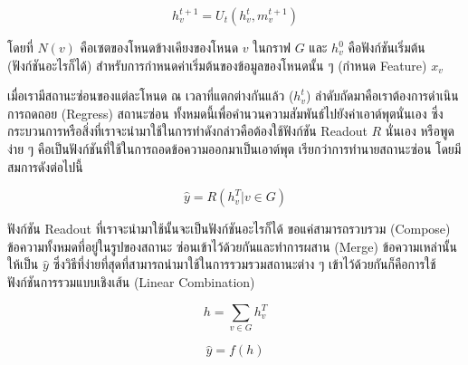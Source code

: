 \begin{equation}\label{hidden_func}
    h^{t+1}_{v} = U_{t}(h^{t}_{v}, m^{t+1}_{v})
\end{equation}

\noindent โดยที่ $N(v)$ คือเซตของโหนดข้างเคียงของโหนด $v$ ในกราฟ $G$ และ $h^{0}_{v}$ คือฟังก์ชันเริ่มต้น (ฟังก์ชันอะไรก็ได้) 
สำหรับการกำหนดค่าเริ่มต้นของข้อมูลของโหนดนั้น ๆ (กำหนด Feature) $x_{v}$

\begin{center}
\end{center}

เมื่อเรามีสถานะซ่อนของแต่ละโหนด ณ เวลาที่แตกต่างกันแล้ว ($h^{t}_{v}$) ลำดับถัดมาคือเราต้องการดำเนินการถดถอย (Regress) สถานะซ่อน%
ทั้งหมดนี้เพื่อคำนวนความสัมพันธ์ไปยังค่าเอาต์พุตนั่นเอง ซึ่งกระบวนการหรือสิ่งที่เราจะนำมาใช้ในการทำดังกล่าวคือต้องใช้ฟังก์ชัน Readout $R$ นั่นเอง
หรือพูดง่าย ๆ คือเป็นฟังก์ชันที่ใช้ในการถอดข้อความออกมาเป็นเอาต์พุต เรียกว่าการทำนายสถานะซ่อน โดยมีสมการดังต่อไปนี้

\begin{equation}
    \hat{y} = R({h^{T}_{v} | v \in G})
\end{equation}

\noindent ฟังก์ชัน Readout ที่เราจะนำมาใช้นั้นจะเป็นฟังก์ชันอะไรก็ได้ ขอแค่สามารถรวบรวม (Compose) ข้อความทั้งหมดที่อยู่ในรูปของสถานะ%
ซ่อนเข้าไว้ด้วยกันและทำการผสาน (Merge) ข้อความเหล่านั้นให้เป็น $\hat{y}$ ซึ่งวิธีที่ง่ายที่สุดที่สามารถนำมาใช้ในการรวมรวมสถานะต่าง ๆ 
เข้าไว้ด้วยกันก็คือการใช้ฟังก์ชันการรวมแบบเชิงเส้น (Linear Combination)

\begin{equation}
    h = \sum_{v \in G} h^{T}_{v}
\end{equation}

\begin{equation}\label{eq:ff_mpnn}
    \hat{y} = f(h)
\end{equation}

